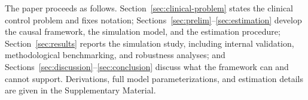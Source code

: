 The paper proceeds as follows. Section~\ref{sec:clinical-problem} states the clinical control problem
and fixes notation; Sections~\ref{sec:prelim}--\ref{sec:estimation} develop the causal framework, the
simulation model, and the estimation procedure; Section~\ref{sec:results} reports the simulation study,
including internal validation, methodological benchmarking, and robustness analyses; and
Sections~\ref{sec:discussion}--\ref{sec:conclusion} discuss what the framework can and cannot support.
Derivations, full model parameterizations, and estimation details are given in the Supplementary Material.
